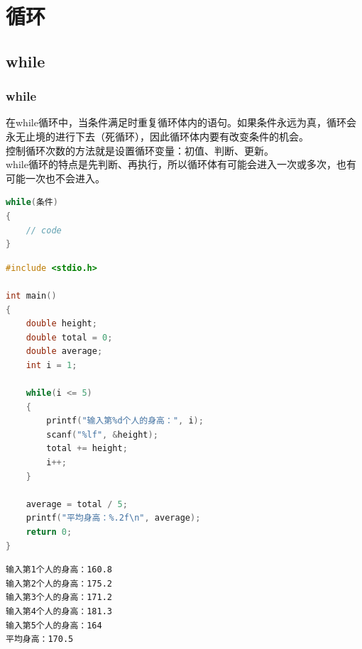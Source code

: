 \chapter{循环}

\section{while}

\subsection{while}

在while循环中，当条件满足时重复循环体内的语句。如果条件永远为真，循环会永无止境的进行下去（死循环），因此循环体内要有改变条件的机会。\\

控制循环次数的方法就是设置循环变量：初值、判断、更新。\\

while循环的特点是先判断、再执行，所以循环体有可能会进入一次或多次，也有可能一次也不会进入。

\vspace{-0.5cm}

\begin{lstlisting}[language=C]
while(条件)
{
    // code
}
\end{lstlisting}

\vspace{0.5cm}


\begin{lstlisting}[language=C]
#include <stdio.h>

int main()
{
    double height;
    double total = 0;
    double average;
    int i = 1;

    while(i <= 5)
    {
        printf("输入第%d个人的身高：", i);
        scanf("%lf", &height);
        total += height;
        i++;
    }

    average = total / 5;
    printf("平均身高：%.2f\n", average);  
    return 0;
}
\end{lstlisting}

\begin{tcolorbox}
	\begin{verbatim}
输入第1个人的身高：160.8
输入第2个人的身高：175.2
输入第3个人的身高：171.2
输入第4个人的身高：181.3
输入第5个人的身高：164
平均身高：170.5
\end{verbatim}
\end{tcolorbox}

